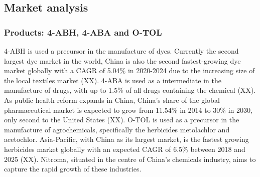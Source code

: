 
\subsection{Market analysis}
\subsubsection{Products: 4-ABH, 4-ABA and O-TOL}
4-ABH is used a precursor in the manufacture of dyes. Currently the second largest dye market in the world, China is also the second fastest-growing dye market globally with a CAGR of 5.04\% in 2020-2024 due to the increasing size of the local textiles market (XX). 4-ABA is used as a intermediate in the manufacture of drugs, with up to 1.5\% of all drugs containing the chemical (XX). As public health reform expands in China, China’s share of the global pharmaceutical market is expected to grow from 11.54\% in 2014 to 30\% in 2030, only second to the United States (XX). O-TOL is used as a precursor in the manufacture of agrochemicals, specifically the herbicides metolachlor and acetochlor. Asia-Pacific, with China as its largest market, is the fastest growing herbicides market globally with an expected CAGR of 6.5\% between 2018 and 2025 (XX). Nitroma, situated in the centre of China’s chemicals industry, aims to capture the rapid growth of these industries.  

